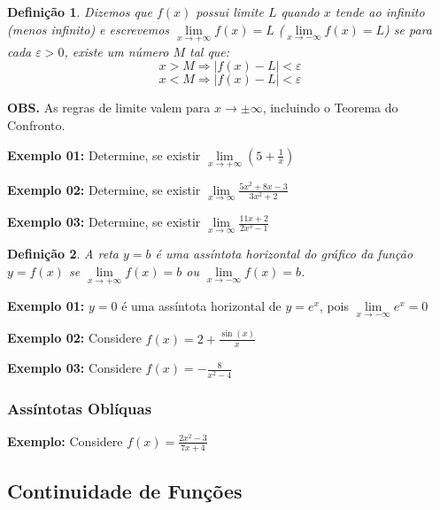 \documentclass[oneside,a4paper,12pt]{article}
\newtheorem{definition}{Definição}[section]
\begin{document}
\begin{definition}
	Dizemos que $f(x)$ possui limite $L$ quando $x$ tende ao infinito \emph{(menos infinito)} e escrevemos $\lim\limits_{x \rightarrow + \infty}f(x) = L$ \emph{($\lim\limits_{x \rightarrow - \infty}f(x) = L$)} se para cada $\varepsilon > 0$, existe um número $M$ tal que:
	$$x > M \Rightarrow |f(x) - L| < \varepsilon$$
	$$x < M \Rightarrow |f(x) - L| < \varepsilon$$
\end{definition}

{\bf OBS. }As regras de limite valem para $x \rightarrow \pm \infty$, incluindo o Teorema do Confronto.

{\bf Exemplo 01: } Determine, se existir $\lim\limits_{x \rightarrow + \infty}\left(5 + \frac{1}{x} \right)$
\vspace{200pt}

{\bf Exemplo 02: } Determine, se existir $\lim\limits_{x \rightarrow \infty}\frac{5x^2+8x-3}{3x^2+2}$
\vspace{200pt}

{\bf Exemplo 03: } Determine, se existir $\lim\limits_{x \rightarrow \infty}\frac{11x+2}{2x^3-1}$
\vspace{200pt}

\begin{definition}
	A reta $y=b$ é uma assíntota horizontal do gráfico da função $y=f(x)$ se $\lim\limits_{x \rightarrow + \infty}f(x) = b$ ou $\lim\limits_{x \rightarrow - \infty}f(x) = b$.
\end{definition}

{\bf Exemplo 01: }$y=0$ é uma assíntota horizontal de $y = e^x$, pois $\lim\limits_{x \rightarrow - \infty}e^x=0$

{\bf Exemplo 02: } Considere $f(x) = 2 + \frac{\sin(x)}{x}$

\vspace{300pt}

{\bf Exemplo 03: } Considere $f(x) = - \frac{8}{x^2-4}$
\vspace{300pt}

\subsubsection{Assíntotas Oblíquas}
{\bf Exemplo: } Considere $f(x) = \frac{2x^2 - 3}{7x + 4}$


\subsection{Continuidade de Funções}
\end{document}
